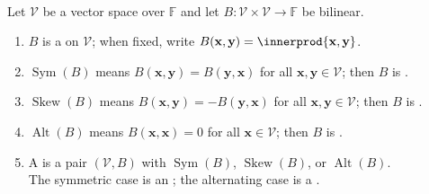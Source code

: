 \begin{definition} \label{def:metric-vector-space-basic-form-types} \\
Let $\mathcal{V}$ be a vector space over $\mathbb{F}$ and let $B:\mathcal{V}\times\mathcal{V}\to\mathbb{F}$ be bilinear.
\begin{enumerate}[label=(\roman*)]
\setlength{\itemsep}{0pt}
\item $B$ is a  on $\mathcal{V}$; when fixed, write $B(\mathbf{x},\mathbf{y})=\innerprod{\mathbf{x},\mathbf{y}}$.
\item $\operatorname{Sym}(B)$ means $B(\mathbf{x},\mathbf{y})=B(\mathbf{y},\mathbf{x})$ for all $\mathbf{x},\mathbf{y}\in\mathcal{V}$; then $B$ is .
\item $\operatorname{Skew}(B)$ means $B(\mathbf{x},\mathbf{y})=-B(\mathbf{y},\mathbf{x})$ for all $\mathbf{x},\mathbf{y}\in\mathcal{V}$; then $B$ is .
\item $\operatorname{Alt}(B)$ means $B(\mathbf{x},\mathbf{x})=0$ for all $\mathbf{x}\in\mathcal{V}$; then $B$ is .
\item A  is a pair $(\mathcal{V},B)$ with $\operatorname{Sym}(B)$, $\operatorname{Skew}(B)$, or $\operatorname{Alt}(B)$.\\
The symmetric case is an ; the alternating case is a .
\end{enumerate}
\end{definition}

